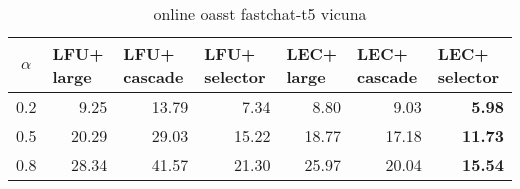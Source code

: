 \begin{table}[ht]
\begin{center}
\begin{tabular}{ cp{3.2em}p{3.2em}p{3.2em}p{3.2em}p{3.2em}p{3.2em} }
  \toprule
  $\alpha$ &  LFU+ large & LFU+ cascade & LFU+ selector & LEC+ large & LEC+ cascade & LEC+ selector \\ 
  \midrule
  0.2 & \multicolumn{1}{r}{ 9.25 } & \multicolumn{1}{r}{ 13.79 } & \multicolumn{1}{r}{ 7.34 } & \multicolumn{1}{r}{ 8.80 } & \multicolumn{1}{r}{ 9.03 } & \multicolumn{1}{r}{ \textbf{ 5.98 } } \\ 
  0.5 & \multicolumn{1}{r}{ 20.29 } & \multicolumn{1}{r}{ 29.03 } & \multicolumn{1}{r}{ 15.22 } & \multicolumn{1}{r}{ 18.77 } & \multicolumn{1}{r}{ 17.18 } & \multicolumn{1}{r}{ \textbf{ 11.73 } } \\ 
  0.8 & \multicolumn{1}{r}{ 28.34 } & \multicolumn{1}{r}{ 41.57 } & \multicolumn{1}{r}{ 21.30 } & \multicolumn{1}{r}{ 25.97 } & \multicolumn{1}{r}{ 20.04 } & \multicolumn{1}{r}{ \textbf{ 15.54 } } \\ 
  \bottomrule
\end{tabular}
\end{center}
\caption{online oasst fastchat-t5 vicuna}
\label{tab:online_oasst_fastchat-t5_vicuna}
\end{table}
